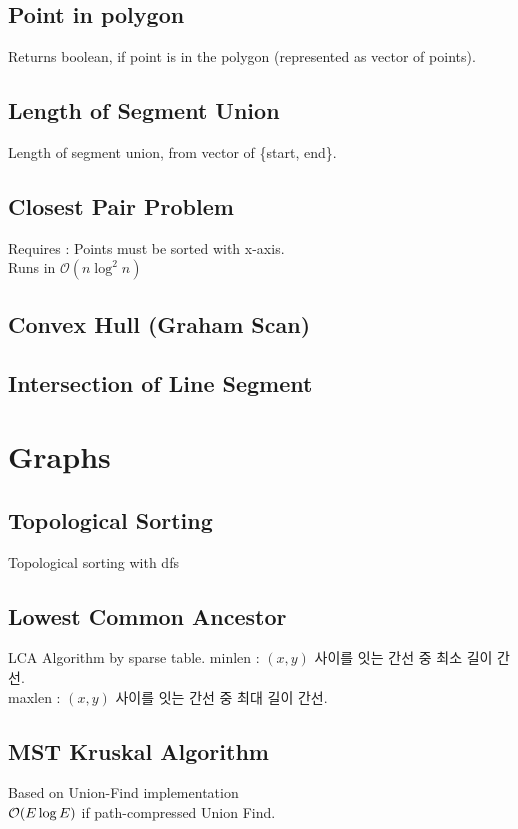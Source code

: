 \documentclass[landscape,8pt]{article}
\begin{document}
\begin{multicols}{2}
  \subsection{Point in polygon}
    Returns boolean, if point is in the polygon (represented as vector of points).
    
  \subsection{Length of Segment Union}
    Length of segment union, from vector of \{start, end\}.
    
  \subsection{Closest Pair Problem}
    Requires : Points must be sorted with x-axis.\\
    Runs in $\mathcal{O}(n \log^2 n)$
    
  \subsection{Convex Hull (Graham Scan)}
    
  \subsection{Intersection of Line Segment}
    
\columnbreak

\section{Graphs}
  \subsection{Topological Sorting}
  Topological sorting with dfs
    

  \subsection{Lowest Common Ancestor}
  LCA Algorithm by sparse table.
  minlen : $(x, y)$ 사이를 잇는 간선 중 최소 길이 간선. \\
  maxlen : $(x, y)$ 사이를 잇는 간선 중 최대 길이 간선.
    

  \subsection{MST Kruskal Algorithm}
  Based on Union-Find implementation\\
  $\order{E \log E}$ if path-compressed Union Find.
    


\end{multicols}
\end{document}
